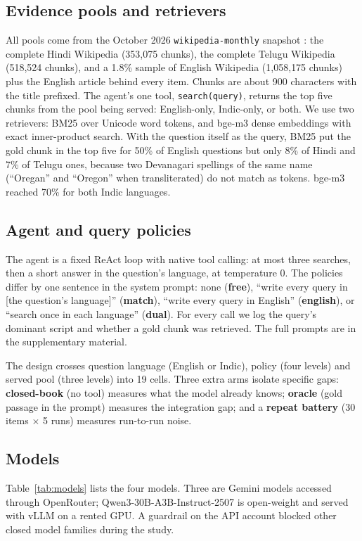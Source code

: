 \subsection{Evidence pools and retrievers}
\label{sec:pool}
All pools come from the October 2026 \texttt{wikipedia-monthly} snapshot \citep{wikipediamonthly2026}: the complete Hindi Wikipedia (353{,}075 chunks), the complete Telugu Wikipedia (518{,}524 chunks), and a 1.8\% sample of English Wikipedia (1{,}058{,}175 chunks) plus the English article behind every item. Chunks are about 900 characters with the title prefixed. The agent's one tool, \texttt{search(query)}, returns the top five chunks from the pool being served: English-only, Indic-only, or both. We use two retrievers: BM25 \citep{robertson2009bm25} over Unicode word tokens, and bge-m3 dense embeddings \citep{a2402_03216} with exact inner-product search. With the question itself as the query, BM25 put the gold chunk in the top five for 50\% of English questions but only 8\% of Hindi and 7\% of Telugu ones, because two Devanagari spellings of the same name (``Oregan'' and ``Oregon'' when transliterated) do not match as tokens. bge-m3 reached 70\% for both Indic languages.

\subsection{Agent and query policies}
\label{sec:agent}
The agent is a fixed ReAct loop \citep{a2210_03629} with native tool calling: at most three searches, then a short answer in the question's language, at temperature 0. The policies differ by one sentence in the system prompt: none (\textbf{free}), ``write every query in [the question's language]'' (\textbf{match}), ``write every query in English'' (\textbf{english}), or ``search once in each language'' (\textbf{dual}). For every call we log the query's dominant script and whether a gold chunk was retrieved. The full prompts are in the supplementary material.

The design crosses question language (English or Indic), policy (four levels) and served pool (three levels) into 19 cells. Three extra arms isolate specific gaps: \textbf{closed-book} (no tool) measures what the model already knows; \textbf{oracle} (gold passage in the prompt) measures the integration gap; and a \textbf{repeat battery} (30 items $\times$ 5 runs) measures run-to-run noise.

\subsection{Models}
\label{sec:models}
Table~\ref{tab:models} lists the four models. Three are Gemini models accessed through OpenRouter; Qwen3-30B-A3B-Instruct-2507 is open-weight and served with vLLM on a rented GPU. A guardrail on the API account blocked other closed model families during the study.

